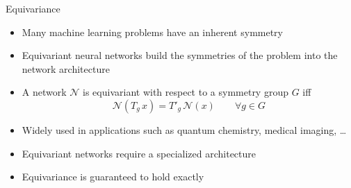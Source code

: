 \documentclass[
                20pt,
                final,
                hyperref={%
                    breaklinks=true,%
                    letterpaper=true,%
                    bookmarks=false%
                }]{beamer}
\newlength{\onecolwid}
\begin{document}
\begin{frame}[t]
\begin{columns}[t]
\begin{column}{\onecolwid}
                \begin{alertblock}{\huge{Equivariance}}
                        \begin{itemize}
                            \item{Many machine learning problems have an inherent symmetry}
                            \item Equivariant neural networks build the symmetries of the problem into the network architecture
                            \item A network $\mathcal{N}$ is equivariant with respect to a symmetry group $ G $ iff \[ \mathcal{N}(T_g\, x)= T'_g\, \mathcal{N}(x)\qquad  \forall g\in G \]
                            \item Widely used in applications such as quantum chemistry, medical imaging, \dots
                            \item Equivariant networks require a specialized architecture
                            \item Equivariance is guaranteed to hold exactly

                        \end{itemize}




\end{alertblock}
\end{column}
\end{columns}
\end{frame}
\end{document}
